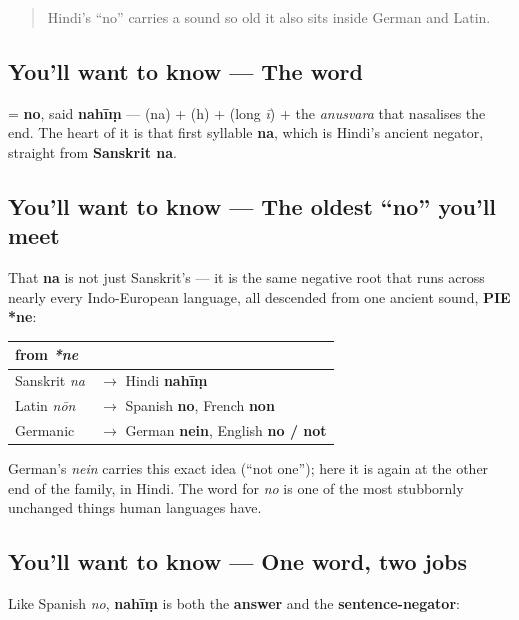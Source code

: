 \label{lesson:HI-C07-nahin}



\begin{quote}
Hindi's \textquotedblleft{}no\textquotedblright{} carries a sound so old it also sits inside German and Latin.
\end{quote}

\subsection*{You'll want to know — The word}
\textbf{} = \textbf{no}, said \textbf{nahīṃ} — \textbf{} (na) + \textbf{} (h) + \textbf{} (long \emph{ī}) + the \textbf{} \emph{anusvara} that nasalises the end. The heart of it is that first syllable \textbf{na}, which is Hindi's ancient negator, straight from \textbf{Sanskrit na}.

\subsection*{You'll want to know — The oldest \textquotedblleft{}no\textquotedblright{} you'll meet}
That \textbf{na} is not just Sanskrit's — it is the same negative root that runs across nearly every Indo-European language, all descended from one ancient sound, \textbf{PIE *ne}:

\noindent
\begin{tabularx}{\linewidth}{@{}>{\raggedright\arraybackslash}X>{\raggedright\arraybackslash}X@{}}
\toprule
\textbf{from \emph{*ne}} & \textbf{} \\
\midrule
Sanskrit \emph{na} & $\to$ Hindi \textbf{nahīṃ} \\
Latin \emph{nōn} & $\to$ Spanish \textbf{no}, French \textbf{non} \\
Germanic & $\to$ German \textbf{nein}, English \textbf{no / not} \\
\bottomrule
\end{tabularx}

German's \emph{nein} carries this exact idea (\textquotedblleft{}not one\textquotedblright{}); here it is again at the other end of the family, in Hindi. The word for \emph{no} is one of the most stubbornly unchanged things human languages have.

\subsection*{You'll want to know — One word, two jobs}
Like Spanish \emph{no}, \textbf{nahīṃ} is both the \textbf{answer} and the \textbf{sentence-negator}:

